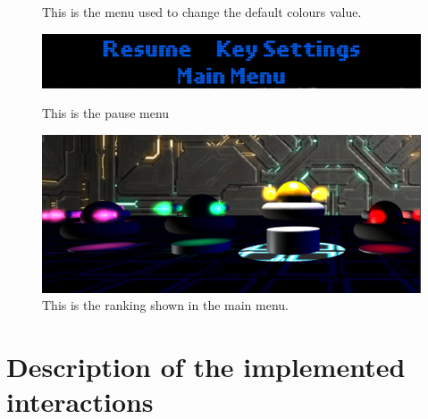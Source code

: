 \documentclass[11pt]{article}
\begin{document}
\begin{figure}
\begin{minipage}[b]{0.3\linewidth}
		\caption{This is the menu used to change the default colours value.}
		\label{fig:colorMenu}
	\end{minipage}
	\begin{minipage}[b]{0.6\linewidth}
		\includegraphics[width=\linewidth]{pauseMenu}
		\caption{This is the pause menu}
		\label{fig:endGameMenu4}
	\end{minipage}
	\begin{minipage}[b]{0.6\linewidth}
		\includegraphics[width=\linewidth]{Ranking}
		\caption{This is the ranking shown in the main menu.}
		\label{fig:Ranking}
	\end{minipage}
\end{figure}

\section{Description of the implemented interactions}
\end{document}
